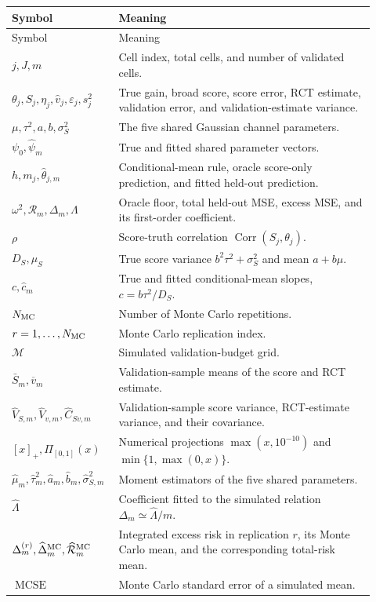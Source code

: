 \documentclass[11pt]{article}
\newcommand{\Corr}{\operatorname{Corr}}
\begin{document}
\begin{longtable}{>{\raggedright\arraybackslash}p{0.24\linewidth}
                  >{\raggedright\arraybackslash}p{0.68\linewidth}}
\hline
Symbol & Meaning \\
\hline
\endfirsthead
\hline
Symbol & Meaning \\
\hline
\endhead
\(j,J,m\) & Cell index, total cells, and number of validated cells. \\
\(\theta_j,S_j,\eta_j,\widehat v_j,\varepsilon_j,s_j^2\) & True gain,
broad score, score error, RCT estimate, validation error, and
validation-estimate variance. \\
\(\mu,\tau^2,a,b,\sigma_S^2\) & The five shared Gaussian channel
parameters. \\
\(\psi_0,\widehat\psi_m\) & True and fitted shared parameter vectors. \\
\(h,m_j,\widehat\theta_{j,m}\) & Conditional-mean rule, oracle score-only
prediction, and fitted held-out prediction. \\
\(\omega^2,\mathcal R_m,\Delta_m,\Lambda\) & Oracle floor, total held-out
MSE, excess MSE, and its first-order coefficient. \\
\(\rho\) & Score-truth correlation \(\Corr(S_j,\theta_j)\). \\
\(D_S,\mu_S\) & True score variance
\(b^2\tau^2+\sigma_S^2\) and mean \(a+b\mu\). \\
\(c,\widehat c_m\) & True and fitted conditional-mean slopes,
\(c=b\tau^2/D_S\). \\
\(N_{\rm MC}\) & Number of Monte Carlo repetitions. \\
\(r=1,\ldots,N_{\rm MC}\) & Monte Carlo replication index. \\
\(\mathcal M\) & Simulated validation-budget grid. \\
\(\bar S_m,\overline v_m\) & Validation-sample means of the score and RCT
estimate. \\
\(\widehat V_{S,m},\widehat V_{v,m},\widehat C_{Sv,m}\) & Validation-sample
score variance, RCT-estimate variance, and their covariance. \\
\([x]_+,\Pi_{[0,1]}(x)\) & Numerical projections
\(\max(x,10^{-10})\) and \(\min\{1,\max(0,x)\}\). \\
\(\widehat\mu_m,\widehat\tau_m^2,\widehat a_m,
\widehat b_m,\widehat\sigma_{S,m}^2\) & Moment estimators of the five shared
parameters. \\
\(\widehat\Lambda\) & Coefficient fitted to the simulated relation
\(\Delta_m\simeq\widehat\Lambda/m\). \\
\(\Delta_m^{(r)},\widehat\Delta_m^{\rm MC},
\widehat{\mathcal R}_m^{\rm MC}\) & Integrated excess risk in replication
\(r\), its Monte Carlo mean, and the corresponding total-risk mean. \\
\(\operatorname{MCSE}\) & Monte Carlo standard error of a simulated mean. \\
\hline
\end{longtable}
\end{document}
